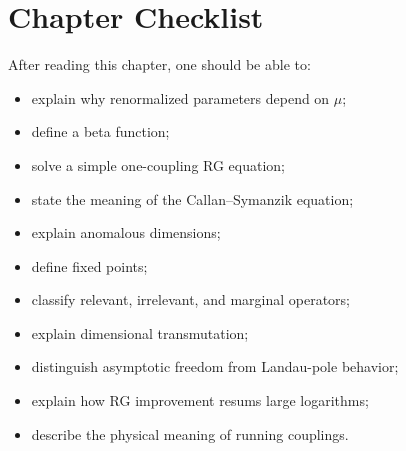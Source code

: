\section{Chapter Checklist}

After reading this chapter, one should be able to:
\begin{itemize}
    \item explain why renormalized parameters depend on \(\mu\);
    \item define a beta function;
    \item solve a simple one-coupling RG equation;
    \item state the meaning of the Callan--Symanzik equation;
    \item explain anomalous dimensions;
    \item define fixed points;
    \item classify relevant, irrelevant, and marginal operators;
    \item explain dimensional transmutation;
    \item distinguish asymptotic freedom from Landau-pole behavior;
    \item explain how RG improvement resums large logarithms;
    \item describe the physical meaning of running couplings.
\end{itemize}
